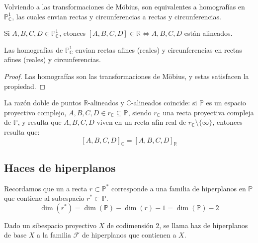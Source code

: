 Volviendo a las transformaciones de Möbius, son equivalentes a homografías en $\mathbb{P}^1_{\mathbb{C}}$, las cuales envian rectas y circunferencias a rectas y circunferencias.

\begin{lema}
    Si $A,B,C,D \in \mathbb{P}^1_{\mathbb{C}}$, etonces $[A,B,C,D] \in \mathbb{R} \iff A,B,C,D$ están alineados.
\end{lema}

\begin{corolario}
    Las homografías de $\mathbb{P}^1_{\mathbb{C}}$ envian rectas afines (reales) y circunferencias en rectas afines (reales) y circunferencias.
\end{corolario}

\begin{proof}
    Las homografías son las transformaciones de Möbius, y estas satisfacen la propiedad.
\end{proof}

\begin{observación}
    La razón doble de puntos $\mathbb{R}$-alineados y $\mathbb{C}$-alineados coincide: si $\mathbb{P}$ es un espacio proyectivo complejo, $A,B,C,D \in r_{\mathbb{C}} \subseteq \mathbb{P}$, siendo $r_{\mathbb{C}}$ una recta proyectiva compleja de $\mathbb{P}$, y resulta que $A,B,C,D$ viven en un recta afín real de $r_{\mathbb{C}} \setminus \{ \infty \}$, entonces resulta que:
    \[
    [A,B,C,D]_{\mathbb{C}} = [A,B,C,D]_{\mathbb{R}}
    \] 
\end{observación}

\subsection{Haces de hiperplanos}

Recordamos que un a recta $r \subset \mathbb{P}^*$ corresponde a una familia de hiperplanos en $\mathbb{P}$ que contiene al subespacio $r^*\subset \mathbb{P}$.
\[
    \dim(r^*) = \dim(\mathbb{P}) - \dim(r) - 1 = \dim(\mathbb{P}) - 2
\]

\begin{definición} 
    Dado un sibespacio proyectivo $X$ de codimensión 2, se llama haz de hiperplanos de base $X$ a la familia $\mathcal{F}$ de hiperplanos que contienen a $X$.
\end{definición}


